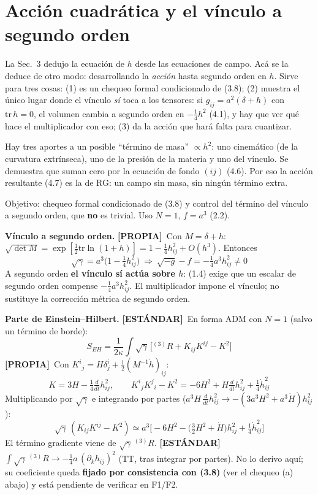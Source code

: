 \documentclass[11pt,a4paper]{article}
\newcommand{\propia}{{\bfseries\color{TealBlue}[PROPIA]}}
\newcommand{\estandar}{{\bfseries\color{BurntOrange}[ESTÁNDAR]}}
\newcommand{\sub}[2]{\par\medskip\noindent{\bfseries\color{NavyBlue}#1}\quad\textbf{#2}}
\begin{document}
\section{Acción cuadrática y el vínculo a segundo orden}

\begin{enpalabras}
La Sec.~3 dedujo la ecuación de $h$ desde las ecuaciones de campo. Acá se la deduce de otro modo: desarrollando la \emph{acción} hasta segundo orden en $h$. Sirve para tres cosas: (1) es un chequeo formal condicionado de (3.8); (2) muestra el único lugar donde el vínculo \emph{sí} toca a los tensores: si $g_{ij}=a^2(\delta+h)$ con $\mathrm{tr}\,h=0$, el volumen cambia a segundo orden en $-\tfrac14h^2$ (4.1), y hay que ver qué hace el multiplicador con eso; (3) da la acción que hará falta para cuantizar.

Hay tres aportes a un posible ``término de masa'' $\propto h^2$: uno cinemático (de la curvatura extrínseca), uno de la presión de la materia y uno del vínculo. Se demuestra que suman cero por la ecuación de fondo $(ij)$ (4.6). Por eso la acción resultante (4.7) es la de RG: un campo sin masa, sin ningún término extra.
\end{enpalabras}

Objetivo: chequeo formal condicionado de (3.8) y control del término del vínculo a segundo orden, que \textbf{no} es trivial. Uso $N=1$, $f=a^3$ (2.2).

\sub{4.1}{Vínculo a segundo orden.} \propia\ Con $M=\delta+h$: $\sqrt{\det M}=\exp[\tfrac12\mathrm{tr}\ln(1+h)]=1-\tfrac14h_{ij}^2+O(h^3)$. Entonces
\begin{equation}
\sqrt\gamma=a^3\big(1-\tfrac14h_{ij}^2\big)\ \Rightarrow\ \sqrt{-g}-f=-\tfrac14a^3h_{ij}^2\neq0\tag{4.1}
\end{equation}
A segundo orden \textbf{el vínculo sí actúa sobre $h$}: (1.4) exige que un escalar de segundo orden compense $-\tfrac14a^3h_{ij}^2$. El multiplicador impone el vínculo; no sustituye la corrección métrica de segundo orden.

\sub{4.2}{Parte de Einstein--Hilbert.} \estandar\ En forma ADM con $N=1$ (salvo un término de borde):\[S_{EH}=\frac1{2\kappa}\int\sqrt\gamma\,\big[{}^{(3)}R+K_{ij}K^{ij}-K^2\big]\]\propia\ Con $K^i{}_j=H\delta^i_j+\tfrac12(M^{-1}\dot h)_{ij}$:
\begin{equation}
K=3H-\tfrac14\tfrac d{dt}h_{ij}^2,\qquad K^i{}_jK^j{}_i-K^2=-6H^2+H\tfrac d{dt}h_{ij}^2+\tfrac14\dot h_{ij}^2\tag{4.2}
\end{equation}
Multiplicando por $\sqrt\gamma$ e integrando por partes ($a^3H\,\frac d{dt}h_{ij}^2\to-(3a^3H^2+a^3\dot H)h_{ij}^2$):
\begin{equation}
\sqrt\gamma\,(K_{ij}K^{ij}-K^2)\simeq a^3\Big[-6H^2-\big(\tfrac32H^2+\dot H\big)h_{ij}^2+\tfrac14\dot h_{ij}^2\Big]\tag{4.3}
\end{equation}
El término gradiente viene de $\sqrt\gamma\,{}^{(3)}R$. \estandar\ $\int\sqrt\gamma\,{}^{(3)}R\to-\tfrac14a\,(\partial_kh_{ij})^2$ (TT, tras integrar por partes). No lo derivo aquí; su coeficiente queda \textbf{fijado por consistencia con (3.8)} (ver el chequeo (a) abajo) y está pendiente de verificar en F1/F2.
\end{document}
